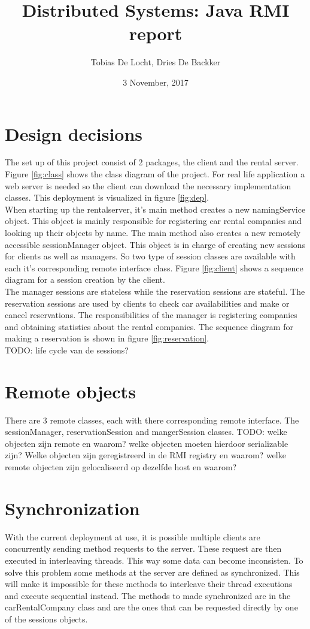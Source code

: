 \documentclass[]{article}
\title{Distributed Systems: Java RMI report}
\author{Tobias De Locht, Dries De Backker}
\date{3 November, 2017}
\begin{document}
\maketitle

\section{Design decisions}
The set up of this project consist of 2 packages, the client and the rental server. Figure \ref{fig:class} shows the class diagram of the project. For real life application a web server is needed so the client can download the necessary implementation classes. This deployment is visualized in figure \ref{fig:dep}.
\\
When starting up the rentalserver, it's main method creates a new namingService object. This object is mainly responsible for registering car rental companies and looking up their objects by name. The main method also creates a new remotely accessible sessionManager object. This object is in charge of creating new sessions for clients as well as managers. So two type of session classes are available with each it's corresponding remote interface class. Figure \ref{fig:client} shows a sequence diagram for a session creation by the client.
\\
The manager sessions are stateless while the reservation sessions are stateful. The reservation sessions are used by clients to check car availabilities and make or cancel reservations. The responsibilities of the manager is registering companies and obtaining statistics about the rental companies. The sequence diagram for making a reservation is shown in figure \ref{fig:reservation}.
\\
TODO: life cycle van de sessions?

 
\section{Remote objects}
There are 3 remote classes, each with there corresponding remote interface. The sessionManager, reservationSession and mangerSession classes.
TODO: welke objecten zijn remote en waarom? welke objecten moeten hierdoor serializable zijn? Welke objecten zijn geregistreerd in de RMI registry en waarom? welke remote objecten zijn gelocaliseerd op dezelfde host en waarom?
\section{Synchronization}
With the current deployment at use, it is possible multiple clients are concurrently sending method requests to the server. These request are then executed in interleaving threads. This way some data can become inconsisten.  To solve this problem some methods at the server are defined as synchronized. This will make it impossible for these methods to interleave their thread executions and execute sequential instead. The methods to made synchronized are in the carRentalCompany class and are the ones that can be requested directly by one of the sessions objects.
\clearpage
\end{document}
